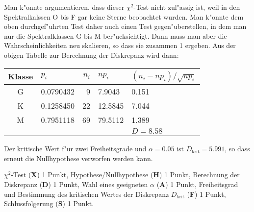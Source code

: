 \begin{diskussion}
Man k"onnte argumentieren, dass dieser $\chi^2$-Test nicht zul"assig ist,
weil in den Spektralkalssen O bis F gar keine Sterne beobachtet wurden.
Man k"onnte dem oben durchgef"uhrten Test daher auch einen Test
gegen"uberstellen, in dem man nur die Spektralklassen G bis M ber"ucksichtigt.
Dann muss man aber die Wahrscheinlichkeiten neu skalieren, so dass sie
zusammen 1 ergeben.
Aus der obigen Tabelle zur Berechnung der Diskrepanz wird dann:
\begin{center}
\begin{tabular}{|c|l|r|l|l|}
\hline
Klasse&$p_i$    &$n_i$&$np_i$            &$(n_i-np_i)/\sqrt{np_i}$\\
\hline
   G  &0.0790432&    9&\phantom{0}7.9043 & 0.151\phantom{882     }\\
   K  &0.1258450&   22&12.5845           & 7.044\phantom{503     }\\
   M  &0.7951118&   69&79.5112           & 1.389\phantom{552     }\\
\hline
      &         &     &                  &$D=8.58$\\
\hline
\end{tabular}
\end{center}
%
%
Der kritische Wert f"ur zwei Freiheitsgrade und $\alpha=0.05$ ist
$D_{\text{krit}}=5.991$,
so dass erneut die Nullhypothese verworfen werden kann.
\end{diskussion}

\begin{bewertung}
$\chi^2$-Test ({\bf X}) 1 Punkt,
Hypothese/Nullhypothese ({\bf H}) 1 Punkt,
Berechnung der Diskrepanz ({\bf D}) 1 Punkt,
Wahl eines geeigneten $\alpha$ ({\bf A}) 1 Punkt,
Freiheitsgrad und Bestimmung des kritischen Wertes der Diskrepanz
$D_{\text{krit}}$ ({\bf F}) 1 Punkt,
Schlussfolgerung ({\bf S}) 1 Punkt.
\end{bewertung}


